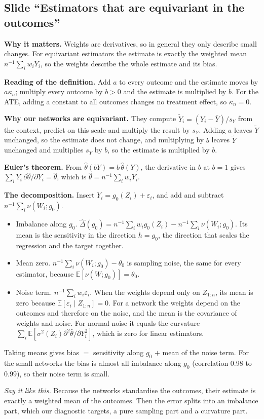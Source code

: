 \documentclass[10pt]{article}
\newcommand{\E}{\mathbb{E}}
\newcommand{\slide}[1]{\subsection*{Slide ``#1''}}
\newcommand{\say}[1]{\par\textit{Say it like this.} #1\par}
\begin{document}
\slide{Estimators that are equivariant in the outcomes}
\textbf{Why it matters.} Weights are derivatives, so in general they only describe small changes. For equivariant
estimators the estimate is exactly the weighted mean $n^{-1}\sum_iw_iY_i$, so the weights describe the whole estimate
and its bias.

\textbf{Reading of the definition.} Add $a$ to every outcome and the estimate moves by $a\kappa_n$; multiply every
outcome by $b>0$ and the estimate is multiplied by $b$. For the ATE, adding a constant to all outcomes changes no
treatment effect, so $\kappa_n=0$.

\textbf{Why our networks are equivariant.} They compute $\tilde Y_i=(Y_i-\bar Y)/s_Y$ from the context, predict on this
scale and multiply the result by $s_Y$. Adding $a$ leaves $\tilde Y$ unchanged, so the estimate does not change, and
multiplying by $b$ leaves $\tilde Y$ unchanged and multiplies $s_Y$ by $b$, so the estimate is multiplied by $b$.

\textbf{Euler's theorem.} From $\hat\theta(bY)=b\,\hat\theta(Y)$, the derivative in $b$ at $b=1$ gives
$\sum_iY_i\,\partial\hat\theta/\partial Y_i=\hat\theta$, which is $\hat\theta=n^{-1}\sum_iw_iY_i$.

\textbf{The decomposition.} Insert $Y_i=g_0(Z_i)+\varepsilon_i$, and add and subtract $n^{-1}\sum_i\nu(W_i;g_0)$.
\begin{itemize}
\item Imbalance along $g_0$. $\hat\Delta(g_0)=n^{-1}\sum_iw_ig_0(Z_i)-n^{-1}\sum_i\nu(W_i;g_0)$. Its mean is the
sensitivity in the direction $h=g_0$, the direction that scales the regression and the target together.
\item Mean zero. $n^{-1}\sum_i\nu(W_i;g_0)-\theta_0$ is sampling noise, the same for every estimator, because
$\E[\nu(W;g_0)]=\theta_0$.
\item Noise term. $n^{-1}\sum_iw_i\varepsilon_i$. When the weights depend only on $Z_{1:n}$, its mean is zero because
$\E[\varepsilon_i\mid Z_{1:n}]=0$. For a network the weights depend on the outcomes and therefore on the noise, and
the mean is the covariance of weights and noise. For normal noise it equals the curvature
$\sum_i\E[\sigma^2(Z_i)\partial^2\hat\theta/\partial Y_i^2]$, which is zero for linear estimators.
\end{itemize}
Taking means gives bias $=$ sensitivity along $g_0$ $+$ mean of the noise term. For the small networks the bias is
almost all imbalance along $g_0$ (correlation 0.98 to 0.99), so their noise term is small.
\say{Because the networks standardise the outcomes, their estimate is exactly a weighted mean of the outcomes. Then the
error splits into an imbalance part, which our diagnostic targets, a pure sampling part and a curvature part.}
\end{document}
